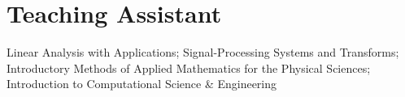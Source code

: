 \section{\sc Teaching Assistant}
Linear Analysis with Applications; Signal-Processing Systems and Transforms; Introductory Methods of Applied Mathematics for the Physical Sciences; Introduction to Computational Science \& Engineering
\endinput